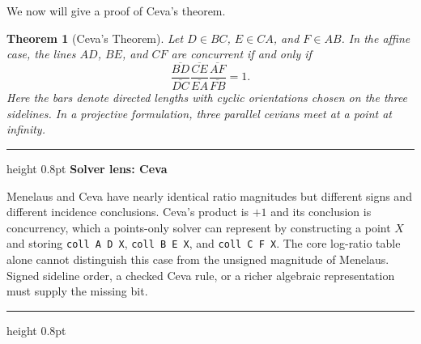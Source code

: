 \documentclass[reqno]{amsart}
\newenvironment{lecturebox}[1]{%
    \par\medskip
    \noindent\begingroup
    \setlength{\parindent}{0pt}
    \color{agblue}\hrule height 0.8pt\color{black}
    \smallskip
    \textbf{\color{agblue}#1}\par\smallskip
}{%
    \smallskip
    \color{agblue}\hrule height 0.8pt\color{black}
    \endgroup
    \medskip
}
\DeclareMathOperator{\1}{\textbf{1}}
\newtheorem{thm}{Theorem}[section]
\begin{document}
We now will give a proof of Ceva's theorem. 

\begin{thm}[Ceva's Theorem]
Let $D\in BC$, $E\in CA$, and $F\in AB$.  In the affine case, the lines
$AD$, $BE$, and $CF$ are concurrent if and only if
\[
 \frac{\overline{BD}}{\overline{DC}}
 \frac{\overline{CE}}{\overline{EA}}
 \frac{\overline{AF}}{\overline{FB}}=1.
\]
Here the bars denote directed lengths with cyclic orientations chosen on the
three sidelines.  In a projective formulation, three parallel cevians meet at
a point at infinity.
\end{thm}

\begin{lecturebox}{Solver lens: Ceva}
Menelaus and Ceva have nearly identical ratio magnitudes but different signs
and different incidence conclusions. Ceva's product is $+1$ and its conclusion
is concurrency, which a points-only solver can represent by constructing a
point $X$ and storing \verb|coll A D X|, \verb|coll B E X|, and
\verb|coll C F X|. The core log-ratio table alone cannot distinguish this case
from the unsigned magnitude of Menelaus. Signed sideline order, a checked
Ceva rule, or a richer algebraic representation must supply the missing bit.
\end{lecturebox}
\end{document}
